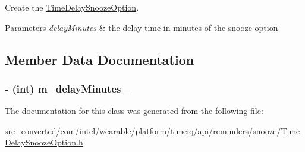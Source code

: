 Create the \hyperlink{interface_time_delay_snooze_option}{Time\+Delay\+Snooze\+Option}. 


\begin{DoxyParams}{Parameters}
{\em delay\+Minutes} & the delay time in minutes of the snooze option \\
\hline
\end{DoxyParams}


\subsection{Member Data Documentation}
\hypertarget{interface_time_delay_snooze_option_a0df442daead3f5ec2b81ff8447043aa2}{}
\subsubsection[{m\+\_\+delay\+Minutes\+\_\+}]{\setlength{\rightskip}{0pt plus 5cm}-\/ (int) m\+\_\+delay\+Minutes\+\_\+}\label{interface_time_delay_snooze_option_a0df442daead3f5ec2b81ff8447043aa2}


The documentation for this class was generated from the following file\+:\begin{DoxyCompactItemize}
\item 
src\+\_\+converted/com/intel/wearable/platform/timeiq/api/reminders/snooze/\hyperlink{_time_delay_snooze_option_8h}{Time\+Delay\+Snooze\+Option.\+h}\end{DoxyCompactItemize}
